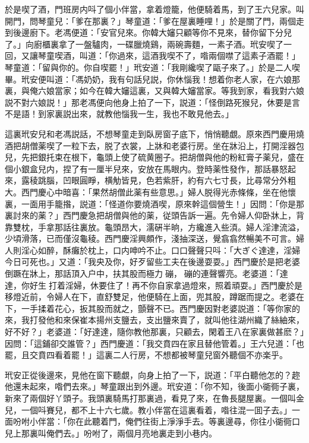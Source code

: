 於是喫了酒，門班房内呌了個小伴當，拿着燈籠，他便騎着馬，到了王六兒家。叫開門，問琴童兒：「爹在那裏？」琴童道：「爹在屋裏睡哩！」於是關了門，兩個走到後邊廚下。老馮便道：「安官兒來。你韓大嬸只顧等你不見來，替你留下分兒了。」向廚櫃裏拿了一盤驢肉，一碟臘燒鷄，兩碗壽麵，一素子酒。玳安喫了一回，又讓琴童喫酒，叫道：「你過來，這酒我喫不了，喒兩個噤了這素子酒罷！」琴童道：「留與你的。你自喫罷！」玳安道：「我剛纔喫了甌子來了。」於是二人喫畢。玳安便叫道：「馮奶奶，我有句話兒説，你休惱我！想着你老人家，在六娘那裏，與俺六娘當家；如今在韓大嬸這裏，又與韓大嬸當家。等我到家，看我對六娘説不對六娘説！」那老馮便向他身上拍了一下，説道：「怪倒路死猴兒，休要是言不是語！到家裏説出來，就教他惱我一生，我也不敢見他去。」

這裏玳安兒和老馮説話，不想琴童走到臥房窗子底下，悄悄聽覷。原來西門慶用燒酒把胡僧薬喫了一粒下去，脱了衣裳，上牀和老婆行房。坐在牀沿上，打開淫器包兒，先把銀托束在根下，龜頭上使了硫黄圈子。把胡僧與他的粉紅膏子薬兒，盛在個小銀盒兒内，捏了有一厘半兒來，安放在馬眼内。登時薬性發作，那話暴怒起來，露稜跳腦，凹眼圓睜，横觔皆見，色若紫肝，約有六七寸長，比尋常分外粗大。西門慶心中暗喜：「果然胡僧此薬有些意思。」婦人脱得光赤條條，坐在他懷裏，一面用手籠揝，説道：「怪道你要燒酒喫，原來幹這個營生！」因問：「你是那裏討來的薬？」西門慶急把胡僧與他的薬，従頭告訴一遍。先令婦人仰卧牀上，背靠雙枕，手拿那話往裏放。龜頭昂大，濡硏半晌，方纔進入些湏。婦人淫津流溢，少頃滑落，已而僅沒龜稜。西門慶淫興頗作，淺抽深送，覺翕翕然暢美不可言。婦人則淫心如醉，酥癱於枕上，口内呻吟不止。口口聲聲只呌：「大ぎぐ達達，淫婦今日可死也。」又道：「我央及你，好歹留些工夫在後邊耍耍。」西門慶於是把老婆倒蹶在牀上，那話頂入户中，扶其股而極力𢵞磞，𢵞磞的連聲響亮。老婆道：「達達，你好生𢵞打着淫婦，休要住了！再不你自家拿過燈來，照着頑耍。」西門慶於是移燈近前，令婦人在下，直舒雙足，他便騎在上面，兜其股，蹲踞而提之。老婆在下，一手揉着花心，扳其股而就之，顫聲不已。西門慶因對老婆説道：「等你家的來，我打發他和來保崔本揚州支鹽去，支出鹽來賣了，就叫他往湖州織了絲紬來，好不好？」老婆道：「好達達，隨你教他那裏，只顧去，閑着王八在家裏做甚麽？」因問：「這鋪卻交誰管？」西門慶道：「我交賁四在家且替他管着。」王六兒道：「也罷，且交賁四看着罷！」這裏二人行房，不想都被琴童兒窗外聽個不亦楽乎。

玳安正從後邊來，見他在窗下聽覷，向身上拍了一下，説道：「平白聽他怎的？趂他還未起來，喒們去來。」琴童跟出到外邊。玳安道：「你不知，後面小衚衕子裏，新來了兩個好丫頭子。我頭裏騎馬打那裏過，看見了來，在魯長腿屋裏。一個叫金兒，一個呌賽兒，都不上十六七歲。教小伴當在這裏看着，喒往混一囬子去。」一面吩咐小伴當：「你在此聽着門，俺們往街上淨淨手去。等裏邊尋，你往小衚衕口兒上那裏叫俺們去。」吩咐了，兩個月亮地裏走到小巷内。

